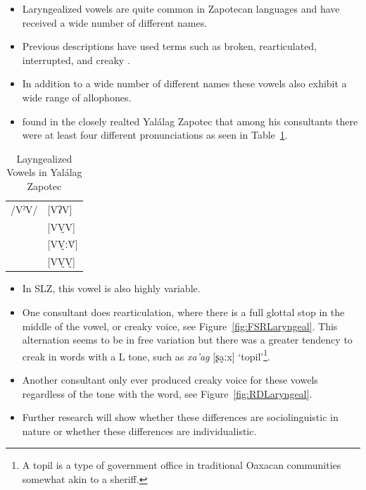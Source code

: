 \documentclass[12pt, letterpaper]{article}
\providecommand{\lsptoprule}{\midrule\toprule}
\providecommand{\lspbottomrule}{\bottomrule\midrule}
\begin{document}
\begin{itemize}
	\item Laryngealized vowels are quite common in Zapotecan languages and have received a wide number of different names. 
	\item Previous descriptions have used terms such as broken, rearticulated, interrupted, and creaky \citep{longDiccionarioZapotecoSan2005,avelinobecerraTopicsYalalagZapotec2004,avelinoAcousticElectroglottographicAnalyses2010,sonnenscheinDescriptiveGrammarSan2005,adlerAcousticsPhonationTypes2016,ariza-garciaPhonationTypesTones2018}.  
	\item In addition to a wide number of different names these vowels also exhibit a wide range of allophones.
	\item \citet{avelinoAcousticElectroglottographicAnalyses2010} found in the closely realted Yalálag Zapotec that among his consultants there were at least four different pronunciations as seen in Table~\ref{tab:laryngeal}. 
\end{itemize}

\begin{table}[!h]
	\centering
	\caption{Layngealized Vowels in Yalálag Zapotec}
	\label{tab:laryngeal}
	 \begin{tabular}{ll}
	\lsptoprule
	/VˀV/	&  [VʔV]  \\
			&  [VV̰V]   \\
			&  [VV̰ːV̆]  \\
			&  [VV̰V̰]	\\
	\lspbottomrule
	\end{tabular}
\end{table}

\begin{itemize}
	\item In SLZ, this vowel is also highly variable.
	\item One consultant does rearticulation, where there is a full glottal stop in the middle of the vowel, or creaky voice, see Figure~\ref{fig:FSRLaryngeal}. This alternation seems to be in free variation but there was a greater tendency to creak in words with a L tone, such as \textit{xa'ag} [ʂa̰ːx] `topil'\footnote{A topil is a type of government office in traditional Oaxacan communities somewhat akin to a sheriff.}.
	\item Another consultant only ever produced creaky voice for these vowels regardless of the tone with the word, see Figure~\ref{fig:RDLaryngeal}.
	\item Further research will show whether these differences are sociolinguistic in nature or whether these differences are individualistic. 
\end{itemize}
\end{document}
